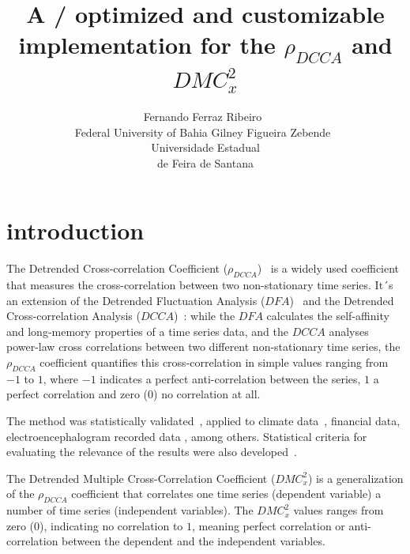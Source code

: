 \documentclass[article]{jss}
\author{Fernando Ferraz Ribeiro~\orcidlink{0000-0002-0685-4774}\\Federal University of Bahia
   \And Gilney Figueira Zebende~\orcidlink{0000-0003-2420-9805}\\Universidade Estadual\\de Feira de Santana}
\title{A \proglang{Python}/\proglang{Zig} optimized and customizable implementation for the $\rho_{DCCA}$ and $DMC_x^2$}
\begin{document}


\section{introduction} \label{sec:intro}

The Detrended Cross-correlation Coefficient ($\rho_{DCCA}$)~\citep{Zebende2011} is a widely used coefficient that measures the cross-correlation between two non-stationary time series. It´s an extension of the Detrended Fluctuation Analysis ($DFA$)~\citep{Peng_1994} and the Detrended Cross-correlation Analysis ($DCCA$)~\citep{Podobnik2008}: while the $DFA$ calculates the self-affinity and long-memory properties of a time series data, and the $DCCA$ analyses power-law cross correlations between two different non-stationary time series, the $\rho_{DCCA}$ coefficient quantifies this cross-correlation in simple values ranging from $-1$ to $1$, where $-1$ indicates a perfect anti-correlation between the series, $1$ a perfect correlation and zero ($0$) no correlation at all.

The method was statistically validated~\citep{PhysRevE.84.066118}, applied to climate data~\cite{vassolerZebende2012}, financial data\citep{Wang2013, Guedes2017, Ferreira2018}, electroencephalogram recorded data \citep{Oliveira2023}, among others. Statistical criteria for evaluating the relevance of the results were also developed~\cite{Guedes2018,Guedes2018a}.

The Detrended Multiple Cross-Correlation Coefficient \citep{Zebende2018} ($DMC_x^2$) is a generalization of the $\rho_{DCCA}$ coefficient that correlates one time series (dependent variable) a number of time series (independent variables). The $DMC_x^2$ values ranges from zero ($0$), indicating no correlation to $1$, meaning perfect correlation or anti-correlation between the dependent and the independent variables.
\end{document}
